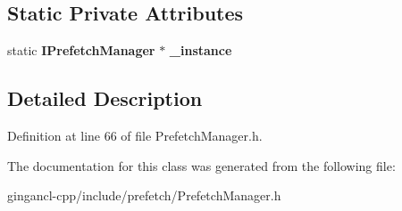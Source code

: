 \subsection*{Static Private Attributes}
\begin{CompactItemize}
\item 
static {\bf IPrefetchManager} $\ast$ {\bf \_\-instance}\label{classbr_1_1pucrio_1_1telemidia_1_1ginga_1_1ncl_1_1prefetch_1_1PrefetchManager_b1a1f41f8676435af29346541918d008}

\end{CompactItemize}


\subsection{Detailed Description}




Definition at line 66 of file PrefetchManager.h.

The documentation for this class was generated from the following file:\begin{CompactItemize}
\item 
gingancl-cpp/include/prefetch/PrefetchManager.h\end{CompactItemize}
